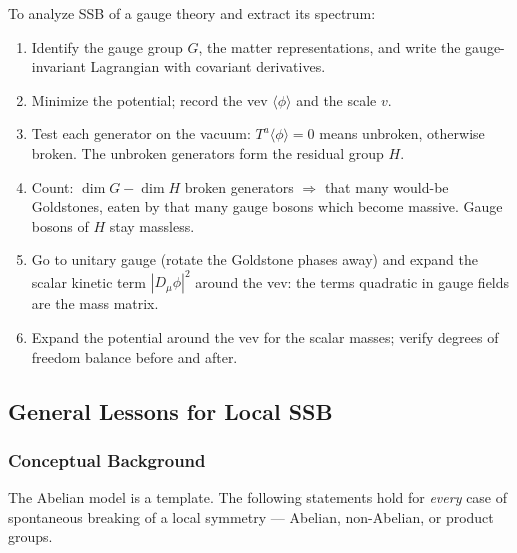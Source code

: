 To analyze SSB of a gauge theory and extract its spectrum:
\begin{enumerate}
  \item Identify the gauge group $G$, the matter representations, and write the gauge-invariant Lagrangian with covariant derivatives.
  \item Minimize the potential; record the vev $\langle\phi\rangle$ and the scale $v$.
  \item Test each generator on the vacuum: $T^a\langle\phi\rangle=0$ means unbroken, otherwise broken. The unbroken generators form the residual group $H$.
  \item Count: $\dim G-\dim H$ broken generators $\Rightarrow$ that many would-be Goldstones, eaten by that many gauge bosons which become massive. Gauge bosons of $H$ stay massless.
  \item Go to unitary gauge (rotate the Goldstone phases away) and expand the scalar kinetic term $|D_\mu\phi|^2$ around the vev: the terms quadratic in gauge fields are the mass matrix.
  \item Expand the potential around the vev for the scalar masses; verify degrees of freedom balance before and after.
\end{enumerate}

\subsection{General Lessons for Local SSB}\label{subsec:lec17:lessons}

\subsubsection*{Conceptual Background}

The Abelian model is a template. The following statements hold for \emph{every} case of spontaneous breaking of a local symmetry --- Abelian, non-Abelian, or product groups.


